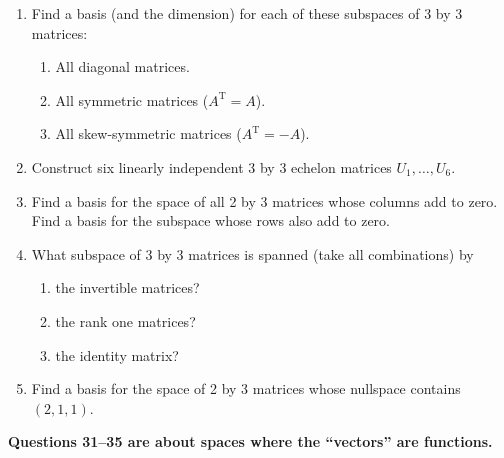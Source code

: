 \documentclass[14pt, a4paper]{article}
\begin{document}
\begin{enumerate}[resume]
    \item Find a basis (and the dimension) for each of these subspaces of 3 by 3 matrices:
          \begin{enumerate}
              \item All diagonal matrices.
              \item All symmetric matrices ($A^{\mathrm{T}} = A$).
              \item All skew-symmetric matrices ($A^{\mathrm{T}} = -A$).
          \end{enumerate}

    \item Construct six linearly independent 3 by 3 echelon matrices $U_1, \dots, U_6$.

    \item Find a basis for the space of all 2 by 3 matrices whose columns add to zero. Find a basis for the subspace whose rows also add to zero.

    \item What subspace of 3 by 3 matrices is spanned (take all combinations) by
          \begin{enumerate}
              \item the invertible matrices?
              \item the rank one matrices?
              \item the identity matrix?
          \end{enumerate}

    \item Find a basis for the space of 2 by 3 matrices whose nullspace contains $(2, 1, 1)$.
\end{enumerate}

\noindent \textbf{Questions 31--35 are about spaces where the ``vectors'' are functions.}
\end{document}
